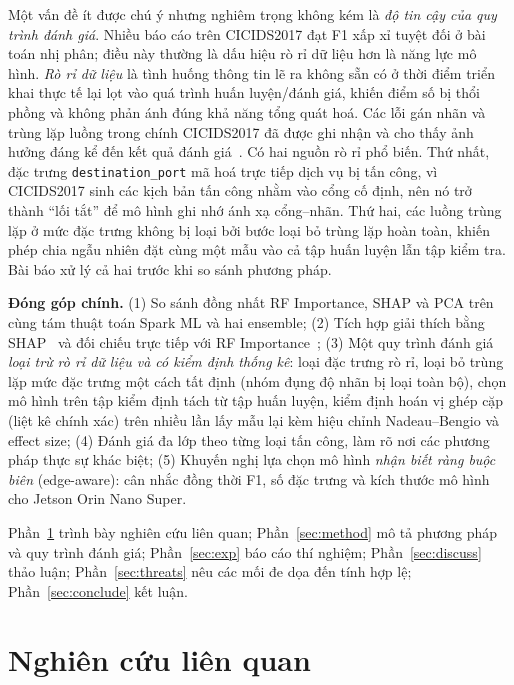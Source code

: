 \documentclass[conference]{IEEEtran}
\begin{document}
Một vấn đề ít được chú ý nhưng nghiêm trọng không kém là \emph{độ tin cậy của quy trình đánh giá}. Nhiều báo cáo trên CICIDS2017 đạt F1 xấp xỉ tuyệt đối ở bài toán nhị phân; điều này thường là dấu hiệu rò rỉ dữ liệu hơn là năng lực mô hình. \emph{Rò rỉ dữ liệu} là tình huống thông tin lẽ ra không sẵn có ở thời điểm triển khai thực tế lại lọt vào quá trình huấn luyện/đánh giá, khiến điểm số bị thổi phồng và không phản ánh đúng khả năng tổng quát hoá. Các lỗi gán nhãn và trùng lặp luồng trong chính CICIDS2017 đã được ghi nhận và cho thấy ảnh hưởng đáng kể đến kết quả đánh giá~\cite{lanvin2023errors}. Có hai nguồn rò rỉ phổ biến. Thứ nhất, đặc trưng \texttt{destination\_port} mã hoá trực tiếp dịch vụ bị tấn công, vì CICIDS2017 sinh các kịch bản tấn công nhằm vào cổng cố định, nên nó trở thành ``lối tắt'' để mô hình ghi nhớ ánh xạ cổng--nhãn. Thứ hai, các luồng trùng lặp ở mức đặc trưng không bị loại bởi bước loại bỏ trùng lặp hoàn toàn, khiến phép chia ngẫu nhiên đặt cùng một mẫu vào cả tập huấn luyện lẫn tập kiểm tra. Bài báo xử lý cả hai trước khi so sánh phương pháp.

\textbf{Đóng góp chính.}
(1) So sánh đồng nhất RF Importance, SHAP và PCA trên cùng tám thuật toán Spark ML và hai ensemble;
(2) Tích hợp giải thích bằng SHAP~\cite{lundberg2017unified} và đối chiếu trực tiếp với RF Importance~\cite{breiman2001random};
(3) Một quy trình đánh giá \emph{loại trừ rò rỉ dữ liệu và có kiểm định thống kê}: loại đặc trưng rò rỉ, loại bỏ trùng lặp mức đặc trưng một cách tất định (nhóm đụng độ nhãn bị loại toàn bộ), chọn mô hình trên tập kiểm định tách từ tập huấn luyện, kiểm định hoán vị ghép cặp (liệt kê chính xác) trên nhiều lần lấy mẫu lại kèm hiệu chỉnh Nadeau--Bengio và effect size;
(4) Đánh giá đa lớp theo từng loại tấn công, làm rõ nơi các phương pháp thực sự khác biệt;
(5) Khuyến nghị lựa chọn mô hình \emph{nhận biết ràng buộc biên} (edge-aware): cân nhắc đồng thời F1, số đặc trưng và kích thước mô hình cho Jetson Orin Nano Super.

Phần~\ref{sec:related} trình bày nghiên cứu liên quan; Phần~\ref{sec:method} mô tả phương pháp và quy trình đánh giá; Phần~\ref{sec:exp} báo cáo thí nghiệm; Phần~\ref{sec:discuss} thảo luận; Phần~\ref{sec:threats} nêu các mối đe dọa đến tính hợp lệ; Phần~\ref{sec:conclude} kết luận.

\section{Nghiên cứu liên quan}
\label{sec:related}
\end{document}
